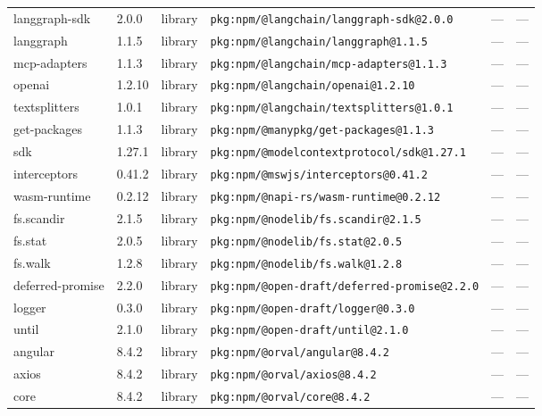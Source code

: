 \documentclass[11pt,a4paper]{article}
\begin{document}
\begin{longtable}{|p{4cm}|p{2cm}|p{1.6cm}|p{5cm}|p{1.5cm}|p{3.5cm}|}
\raggedright langgraph-sdk & 2.0.0 & library & \small\texttt{pkg:npm/@langchain/langgraph-sdk@2.0.0} & — & \small — \\
\raggedright langgraph & 1.1.5 & library & \small\texttt{pkg:npm/@langchain/langgraph@1.1.5} & — & \small — \\
\raggedright mcp-adapters & 1.1.3 & library & \small\texttt{pkg:npm/@langchain/mcp-adapters@1.1.3} & — & \small — \\
\raggedright openai & 1.2.10 & library & \small\texttt{pkg:npm/@langchain/openai@1.2.10} & — & \small — \\
\raggedright textsplitters & 1.0.1 & library & \small\texttt{pkg:npm/@langchain/textsplitters@1.0.1} & — & \small — \\
\raggedright get-packages & 1.1.3 & library & \small\texttt{pkg:npm/@manypkg/get-packages@1.1.3} & — & \small — \\
\raggedright sdk & 1.27.1 & library & \small\texttt{pkg:npm/@modelcontextprotocol/sdk@1.27.1} & — & \small — \\
\raggedright interceptors & 0.41.2 & library & \small\texttt{pkg:npm/@mswjs/interceptors@0.41.2} & — & \small — \\
\raggedright wasm-runtime & 0.2.12 & library & \small\texttt{pkg:npm/@napi-rs/wasm-runtime@0.2.12} & — & \small — \\
\raggedright fs.scandir & 2.1.5 & library & \small\texttt{pkg:npm/@nodelib/fs.scandir@2.1.5} & — & \small — \\
\raggedright fs.stat & 2.0.5 & library & \small\texttt{pkg:npm/@nodelib/fs.stat@2.0.5} & — & \small — \\
\raggedright fs.walk & 1.2.8 & library & \small\texttt{pkg:npm/@nodelib/fs.walk@1.2.8} & — & \small — \\
\raggedright deferred-promise & 2.2.0 & library & \small\texttt{pkg:npm/@open-draft/deferred-promise@2.2.0} & — & \small — \\
\raggedright logger & 0.3.0 & library & \small\texttt{pkg:npm/@open-draft/logger@0.3.0} & — & \small — \\
\raggedright until & 2.1.0 & library & \small\texttt{pkg:npm/@open-draft/until@2.1.0} & — & \small — \\
\raggedright angular & 8.4.2 & library & \small\texttt{pkg:npm/@orval/angular@8.4.2} & — & \small — \\
\raggedright axios & 8.4.2 & library & \small\texttt{pkg:npm/@orval/axios@8.4.2} & — & \small — \\
\raggedright core & 8.4.2 & library & \small\texttt{pkg:npm/@orval/core@8.4.2} & — & \small — \\

\end{longtable}
\end{document}
